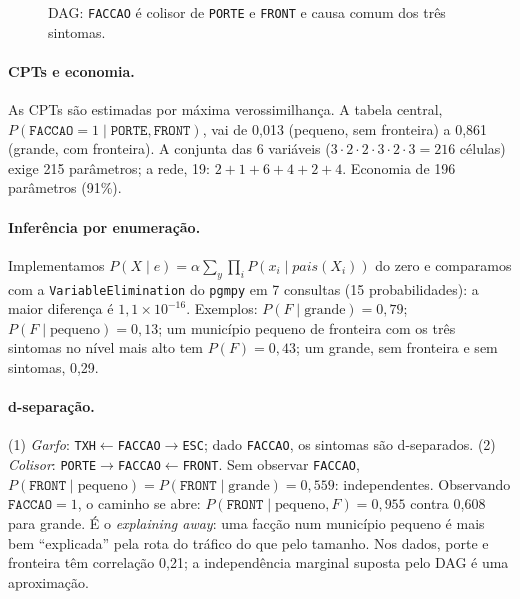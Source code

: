 \documentclass[10pt,a4paper,twocolumn]{article}
\newcommand{\F}{\texttt{FACCAO}}
\begin{document}
\begin{figure}[t]
\centering
{}
\caption{DAG: \F{} é colisor de \texttt{PORTE} e \texttt{FRONT} e causa comum dos três
sintomas.}\label{fig:dag}
\end{figure}

\paragraph{CPTs e economia.} As CPTs são estimadas por máxima verossimilhança. A tabela
central, $P(\F{=}1\mid\texttt{PORTE},\texttt{FRONT})$, vai de 0,013 (pequeno, sem fronteira)
a 0,861 (grande, com fronteira). A conjunta das 6 variáveis ($3\cdot2\cdot2\cdot3\cdot2\cdot3=216$
células) exige 215 parâmetros; a rede, 19: $2+1+6+4+2+4$. Economia de 196 parâmetros (91\%).

\paragraph{Inferência por enumeração.} Implementamos
$P(X\mid e)=\alpha\sum_y\prod_i P(x_i\mid pais(X_i))$ do zero e comparamos com a
\texttt{VariableElimination} do \texttt{pgmpy} em 7 consultas (15 probabilidades): a maior
diferença é $1{,}1\times10^{-16}$. Exemplos: $P(F\mid\text{grande})=0{,}79$;
$P(F\mid\text{pequeno})=0{,}13$; um município pequeno de fronteira com os três sintomas no
nível mais alto tem $P(F)=0{,}43$; um grande, sem fronteira e sem sintomas, 0,29.

\paragraph{d-separação.} (1) \emph{Garfo}: \texttt{TXH}$\leftarrow$\F$\rightarrow$\texttt{ESC};
dado \F, os sintomas são d-separados. (2) \emph{Colisor}:
\texttt{PORTE}$\rightarrow$\F$\leftarrow$\texttt{FRONT}. Sem observar \F,
$P(\texttt{FRONT}\mid\text{pequeno})=P(\texttt{FRONT}\mid\text{grande})=0{,}559$:
independentes. Observando $\F{=}1$, o caminho se abre:
$P(\texttt{FRONT}\mid\text{pequeno},F)=0{,}955$ contra 0,608 para grande. É o
\emph{explaining away}: uma facção num município pequeno é mais bem ``explicada'' pela rota
do tráfico do que pelo tamanho. Nos dados, porte e fronteira têm correlação 0,21; a
independência marginal suposta pelo DAG é uma aproximação.
\end{document}
